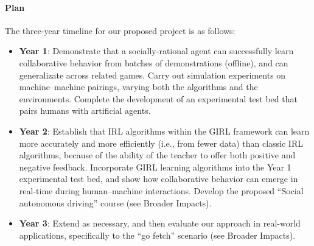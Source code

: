 
\vspace{\up}
\paragraph{Plan}

The three-year timeline for our proposed project is as follows:

\begin{itemize}
\item {\bf Year 1}: Demonstrate that a socially-rational agent can
  successfully learn collaborative behavior from batches of
  demonstrations (offline), and can generalizate across related games.
  Carry out simulation experiments on machine--machine pairings,
  varying both the algorithms and the environments.  Complete the
  development of an experimental test bed that pairs humans with
  artificial agents.

\item {\bf Year 2}: Establish that IRL algorithms within the GIRL
  framework can learn more accurately and more efficiently (i.e., from
  fewer data) than classic IRL algorithms, because of the ability of
  the teacher to offer both positive and negative feedback.
  Incorporate GIRL learning algorithms into the Year 1 experimental
  test bed, and show how collaborative behavior can emerge in
  real-time during human--machine interactions.  Develop the proposed
  ``Social autonomous driving'' course (see Broader Impacts).

\item {\bf Year 3}: Extend as necessary, and then evaluate our
  approach in real-world applications, specifically to the ``go
  fetch'' scenario (see Broader Impacts).

\end{itemize}

